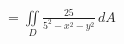 \documentclass[preview]{standalone}
\begin{document}
\begin{align*}
= \iint\limits_D \frac{25}{5^2-x^2-y^2}\, dA
\end{align*}
\end{document}
